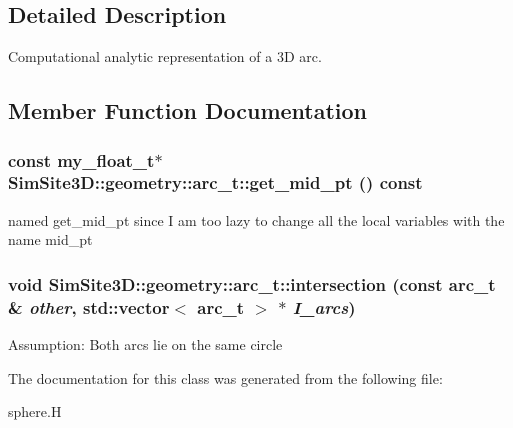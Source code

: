 \subsection{Detailed Description}
Computational analytic representation of a 3D arc. 



\subsection{Member Function Documentation}
\subsubsection{\setlength{\rightskip}{0pt plus 5cm}const my\_\-float\_\-t$\ast$ SimSite3D::geometry::arc\_\-t::get\_\-mid\_\-pt () const\hspace{0.3cm}{\tt  [inline]}}\label{classSimSite3D_1_1geometry_1_1arc__t_86f92d310b8cc785ae09c45201f97258}


named get\_\-mid\_\-pt since I am too lazy to change all the local variables with the name mid\_\-pt 
\subsubsection{\setlength{\rightskip}{0pt plus 5cm}void SimSite3D::geometry::arc\_\-t::intersection (const \bf{arc\_\-t} \& {\em other}, std::vector$<$ \bf{arc\_\-t} $>$ $\ast$ {\em I\_\-arcs})\hspace{0.3cm}{\tt  [inline]}}\label{classSimSite3D_1_1geometry_1_1arc__t_05ed53967368242ccad327e056f1d897}


Assumption: Both arcs lie on the same circle 

The documentation for this class was generated from the following file:\begin{CompactItemize}
\item 
sphere.H\end{CompactItemize}
